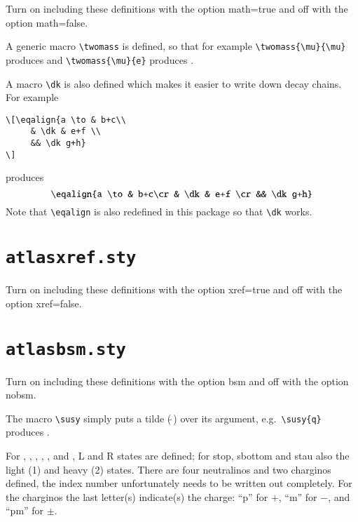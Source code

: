 \documentclass[koma,UKenglish]{latex/atlasdoc}
\newcommand{\File}[1]{\texttt{#1}\xspace}
\newcommand{\Macro}[1]{\texttt{\textbackslash #1}\xspace}
\newcommand{\Option}[1]{\textsf{#1}\xspace}
\begin{document}
{Turn on including these definitions with the option \Option{math=true} and off with the option \Option{math=false}.



\noindent A generic macro \verb|\twomass| is defined, so that for example
\verb|\twomass{\mu}{\mu}| produces \twomass{\mu}{\mu} and \verb|\twomass{\mu}{e}| produces .

A macro \verb|\dk| is also defined which makes it easier to write down decay chains.
For example
\begin{verbatim}
\[\eqalign{a \to & b+c\\
	 & \dk & e+f \\
	 && \dk g+h}
\]
\end{verbatim}
produces
\[\eqalign{a \to & b+c\cr
	 & \dk & e+f \cr
	 && \dk g+h}
\]
Note that \Macro{eqalign} is also redefined in this package so that \Macro{dk} works.


\newpage
\section{\File{atlasxref.sty}}

Turn on including these definitions with the option \Option{xref=true} and off with the option \Option{xref=false}.




\newpage
\section{\File{atlasbsm.sty}}

Turn on including these definitions with the option \Option{bsm} and off with the option \Option{nobsm}.

The macro \Macro{susy} simply puts a tilde ($\tilde{\ }$) over its argument,
e.g.\ \verb|\susy{q}| produces .

For , , , \slepton, \sel, \smu and
\stau, L and R states are defined; for stop, sbottom and stau also the
light (1) and heavy (2) states.
There are four neutralinos and two charginos defined, 
the index number unfortunately needs to be written out completely. 
For the charginos the last letter(s) indicate(s) the charge: 
\enquote{p} for $+$, \enquote{m} for $-$, and \enquote{pm} for $\pm$.

}
\end{document}
